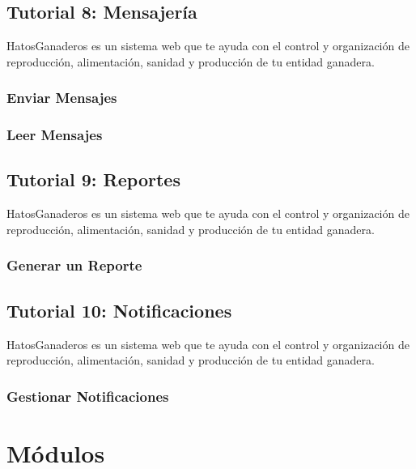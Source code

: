 \documentclass[letterpaper,10pt,spanish]{sphinxmanual}
\begin{document}
\section{Tutorial 8: Mensajería}
\label{Tutorial 8: Mensajer_xeda::doc}\label{Tutorial 8: Mensajer_xeda:tutorial-8-mensajeria}
HatosGanaderos es un sistema web que te ayuda con el control y organización de reproducción, alimentación, sanidad y producción de tu entidad ganadera.


\subsection{Enviar Mensajes}
\label{Tutorial 8: Mensajer_xeda:enviar-mensajes}

\subsection{Leer Mensajes}
\label{Tutorial 8: Mensajer_xeda:leer-mensajes}

\section{Tutorial 9: Reportes}
\label{Tutorial 9: Reportes:tutorial-9-reportes}\label{Tutorial 9: Reportes::doc}
HatosGanaderos es un sistema web que te ayuda con el control y organización de reproducción, alimentación, sanidad y producción de tu entidad ganadera.


\subsection{Generar un Reporte}
\label{Tutorial 9: Reportes:generar-un-reporte}

\section{Tutorial 10: Notificaciones}
\label{Tutorial 10: Notificaciones::doc}\label{Tutorial 10: Notificaciones:tutorial-10-notificaciones}
HatosGanaderos es un sistema web que te ayuda con el control y organización de reproducción, alimentación, sanidad y producción de tu entidad ganadera.


\subsection{Gestionar Notificaciones}
\label{Tutorial 10: Notificaciones:gestionar-notificaciones}

\chapter{Módulos}
\label{index:modulos}
\end{document}
